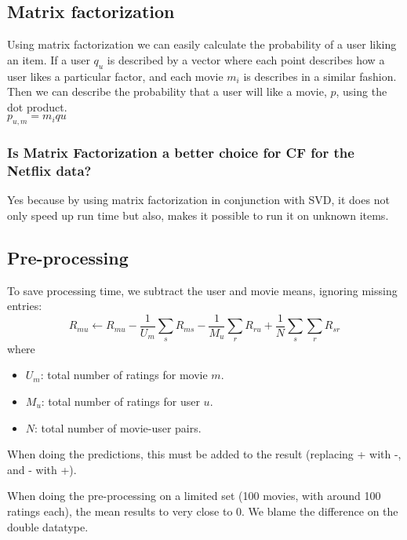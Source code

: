\subsection{Matrix factorization}
Using matrix factorization we can easily calculate the probability of a user liking an item. If a user $q_{u}$ is described by a vector where each point describes how a user likes a particular factor, and each movie $m_{i}$ is describes in a similar fashion.  Then we can describe the probability that a user will like a movie, $p$, using the dot product.\\

$ p_{u,m} = m_{i}q{u}$

\subsubsection{Is Matrix Factorization a better choice for CF for the Netflix data?}
Yes because by using matrix factorization in conjunction with SVD, it does not only speed up run time but also, makes it possible to run it on unknown items.

\subsection{Pre-processing}
To save processing time, we subtract the user and movie means, ignoring missing entries:
\[
    R_{mu} \gets R_{mu} - \frac{1}{U_m}\sum_{s}{R_{ms}} - \frac{1}{M_u}\sum_{r}{R_{ru}} + \frac{1}{N}\sum_{s}\sum_{r}{R_{sr}}
\]
where
\begin{itemize}
    \item $U_m$: total number of ratings for movie $m$.
    \item $M_u$: total number of ratings for user $u$.
    \item $N$: total number of movie-user pairs.
\end{itemize}
%
When doing the predictions, this must be added to the result (replacing + with -, and - with +).

When doing the pre-processing on a limited set (100 movies, with around 100 ratings each), the mean results to very close to 0. We blame the difference on the double datatype.